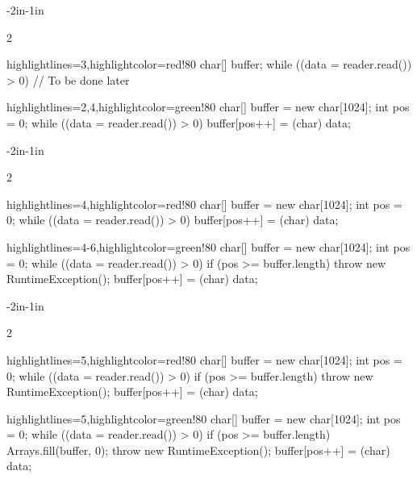 \documentclass{article}
\begin{document}
\flush

\newenvironment{snippet}
  {\begin{adjustwidth}{-2in}{-1in}\setstretch{0.85}\begin{multicols}{2}\small}
  {\end{multicols}\end{adjustwidth}\flush}

\begin{snippet}
\begin{ffcode*}{highlightlines={3},highlightcolor=red!80}
char[] buffer;
while ((data = reader.read()) > 0) {
  // To be done later
}
\end{ffcode*}
\columnbreak
\begin{ffcode*}{highlightlines={2,4},highlightcolor=green!80}
char[] buffer = new char[1024];
int pos = 0;
while ((data = reader.read()) > 0) {
  buffer[pos++] = (char) data;
}
\end{ffcode*}
\end{snippet}

\newpage
{}
\begin{snippet}
\begin{ffcode*}{highlightlines={4},highlightcolor=red!80}
char[] buffer = new char[1024];
int pos = 0;
while ((data = reader.read()) > 0) {
  buffer[pos++] = (char) data;
}
\end{ffcode*}
\columnbreak
\begin{ffcode*}{highlightlines={4-6},highlightcolor=green!80}
char[] buffer = new char[1024];
int pos = 0;
while ((data = reader.read()) > 0) {
  if (pos >= buffer.length) {
    throw new RuntimeException();
  }
  buffer[pos++] = (char) data;
}
\end{ffcode*}
\end{snippet}

\newpage
{}
\begin{snippet}
\begin{ffcode*}{highlightlines={5},highlightcolor=red!80}
char[] buffer = new char[1024];
int pos = 0;
while ((data = reader.read()) > 0) {
  if (pos >= buffer.length) {
    throw new RuntimeException();
  }
  buffer[pos++] = (char) data;
}
\end{ffcode*}
\columnbreak
\begin{ffcode*}{highlightlines={5},highlightcolor=green!80}
char[] buffer = new char[1024];
int pos = 0;
while ((data = reader.read()) > 0) {
  if (pos >= buffer.length) {
    Arrays.fill(buffer, 0);
    throw new RuntimeException();
  }
  buffer[pos++] = (char) data;
}
\end{ffcode*}
\end{snippet}
\end{document}
